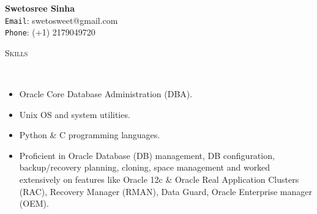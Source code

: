 \documentclass[9pt]{article}
\newenvironment{changemargin}[2]{%
  \begin{list}{}{%
    \setlength{\topsep}{0pt}%
    \setlength{\leftmargin}{#1}%
    \setlength{\rightmargin}{#2}%
    \setlength{\listparindent}{\parindent}%
    \setlength{\itemindent}{\parindent}%
    \setlength{\parsep}{\parskip}%
  }%
  \item[]}{\end{list}
}
\newcommand{\lineover}{
	\begin{changemargin}{-0.05in}{-0.05in}
		\vspace*{-8pt}
		\hrulefill \\
		\vspace*{-2pt}
	\end{changemargin}
}
\newcommand{\header}[1]{
	\begin{changemargin}{-0.5in}{-0.5in}
		\scshape{#1}\\
  	\lineover
	\end{changemargin}
}
\newenvironment{body} {
	\vspace*{-16pt}
	\begin{changemargin}{-0.25in}{-0.5in}
  }
	{\end{changemargin}
}
\begin{document}
	\begin{changemargin}{-0.5in}{-0.5in}
\begin{center}
 {\Large \textbf{Swetosree Sinha}} \\
 {{\texttt{Email}: swetosweet@gmail.com}} \\
 {{\texttt{Phone}: (+1) 2179049720}} \\
\end{center}

\end{changemargin}


\header{Skills}
\begin{body}
	\vspace{14pt}
	\begin{itemize} \itemsep -0pt
    \item Oracle Core Database Administration (DBA).
    \item Unix OS and system utilities.
    \item Python \& C programming languages.
    \item Proficient in Oracle Database (DB) management, DB configuration, backup/recovery planning, cloning, space management and worked extensively on features like Oracle 12c \& Oracle Real Application Clusters (RAC), Recovery Manager (RMAN), Data Guard, Oracle Enterprise manager (OEM).
	  \end{itemize}

        \medskip
\end{body}


\smallskip
\end{document}
